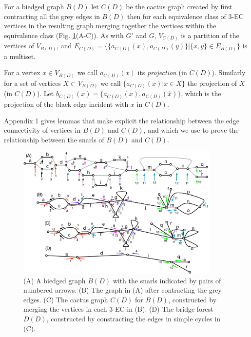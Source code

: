 \documentclass[11pt]{ucthesis}
\begin{document}
For a  biedged graph $B(D)$ let $C(D)$ be the cactus graph created by first contracting all the grey edges in $B(D)$ then for each equivalence class of 3-EC vertices in the resulting graph merging together the vertices within the equivalence class (Fig. \ref{fig:biedged_graphs_and_cactus_graphs}(A-C)). As with $G'$ and $G$, $V_{C(D)}$ is a partition of the vertices of $V_{B(D)}$, and $E_{C(D)} = \{ \{ a_{C(D)}(x), a_{C(D)}(y) \} | \{x, y\} \in E_{B(D)} \}$ is a multiset. 

For a vertex $x \in V_{B(D)}$ we call $a_{C(D)}(x)$ its \emph{projection} (in $C(D)$). Similarly for a set of vertices $X \subset V_{B(D)}$ we call $\{ a_{C(D)}(x) | x \in X \}$ the projection of $X$ (in $C(D)$). Let $b_{C(D)}(x) = \{ a_{C(D)}(x), a_{C(D)}(\hat{x}) \}$, which is the projection of the black edge incident with $x$ in $C(D)$.

Appendix 1 gives lemmas that make explicit the relationship between the edge connectivity of vertices in $B(D)$ and $C(D)$, and which we use to prove the relationship between the snarls of $B(D)$ and $C(D)$. 

\begin{figure}
\centering
\includegraphics[width=0.9\textwidth]{snarlfigures/fig3.pdf}
\caption{\label{fig:biedged_graphs_and_cactus_graphs} (A) A biedged graph $B(D)$ with the snarls indicated by pairs of numbered arrows. (B) The graph in (A) after contracting the grey edges. (C) The cactus graph $C(D)$ for $B(D)$, constructed by merging the vertices in each 3-EC in (B). (D) The bridge forest $D(D)$, constructed by constracting the edges in simple cycles in (C). }
\end{figure}
\end{document}
